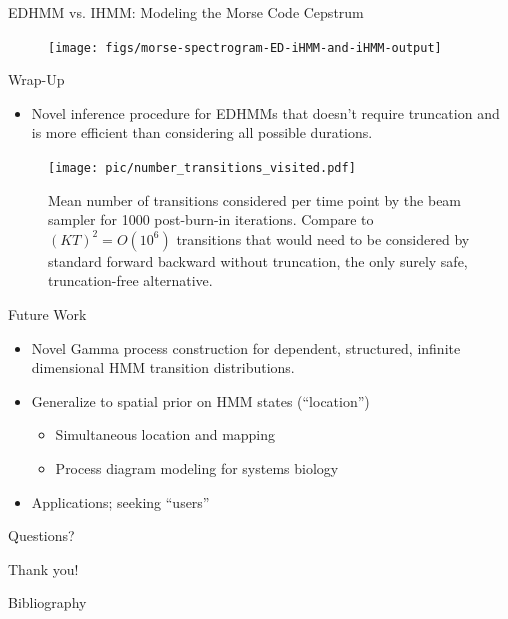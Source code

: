 \documentclass[xcolor=dvipsnames]{beamer}
\begin{document}
\begin{frame}[t]{EDHMM vs. IHMM:  Modeling the Morse Code Cepstrum}
	\begin{figure}[t]
		\begin{center}
			\texttt{[image: figs/morse-spectrogram-ED-iHMM-and-iHMM-output]}
		\end{center}
	\end{figure}
\end{frame}

\begin{frame}[t]{Wrap-Up}
\begin{itemize}
\item Novel inference procedure for EDHMMs that doesn't require truncation and is more efficient than considering all possible durations.
\end{itemize}
\begin{figure}
    \texttt{[image: pic/number\_transitions\_visited.pdf]}

\caption{Mean number of transitions considered per time point by the beam sampler for 1000 post-burn-in iterations. Compare to $(KT)^2 = O(10^6)$ transitions that would need to be considered by standard forward backward without truncation, the only surely safe, truncation-free alternative.}
\label{fig:allowed}
\end{figure}

\end{frame}

\begin{frame}[t]{Future Work}
\begin{itemize}
\item Novel Gamma process construction for dependent, structured, infinite dimensional HMM transition distributions.
\item Generalize to spatial prior on HMM states (``location'')
\begin{itemize}
\item Simultaneous location and mapping
\item Process diagram modeling for systems biology
\end{itemize}
\item Applications; seeking ``users''
\end{itemize}

\end{frame}

\begin{frame}[t]{Questions?}

Thank you!

\end{frame}



	
	\begin{frame}[t,allowframebreaks]{Bibliography}


\end{frame}
\end{document}
